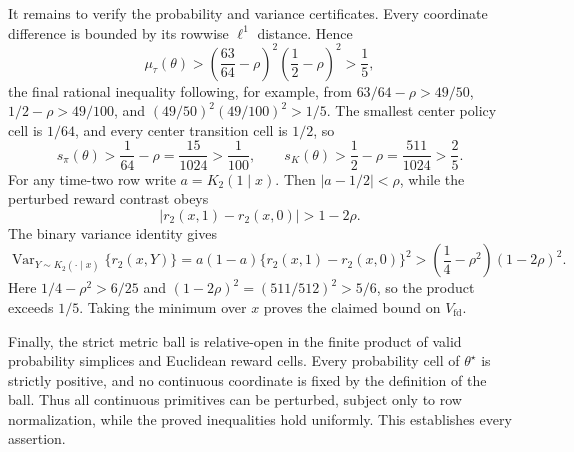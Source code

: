 It remains to verify the probability and variance certificates.  Every coordinate difference is bounded by its rowwise \(\ell^1\) distance.  Hence
\[
 \mu_\tau(\theta)
 >\left(\frac{63}{64}-\rho\right)^2
   \left(\frac12-\rho\right)^2>\frac15,
\]
the final rational inequality following, for example, from \(63/64-\rho>49/50\), \(1/2-\rho>49/100\), and \((49/50)^2(49/100)^2>1/5\).  The smallest center policy cell is \(1/64\), and every center transition cell is \(1/2\), so
\[
 s_\pi(\theta)>\frac1{64}-\rho=\frac{15}{1024}>\frac1{100},
 \qquad
 s_K(\theta)>\frac12-\rho=\frac{511}{1024}>\frac25.
\]
For any time-two row write \(a=K_2(1\mid x)\).  Then \(|a-1/2|<\rho\), while the perturbed reward contrast obeys
\[
 |r_2(x,1)-r_2(x,0)|>1-2\rho.
\]
The binary variance identity gives
\[
 \operatorname{Var}_{Y\sim K_2(\cdot\mid x)}\{r_2(x,Y)\}
 =a(1-a)\{r_2(x,1)-r_2(x,0)\}^2
 >\left(\frac14-\rho^2\right)(1-2\rho)^2.
\]
Here \(1/4-\rho^2>6/25\) and \((1-2\rho)^2=(511/512)^2>5/6\), so the product exceeds \(1/5\).  Taking the minimum over \(x\) proves the claimed bound on \(V_{\mathrm{fd}}\).

Finally, the strict metric ball is relative-open in the finite product of valid probability simplices and Euclidean reward cells.  Every probability cell of \(\theta^\star\) is strictly positive, and no continuous coordinate is fixed by the definition of the ball.  Thus all continuous primitives can be perturbed, subject only to row normalization, while the proved inequalities hold uniformly.  This establishes every assertion.